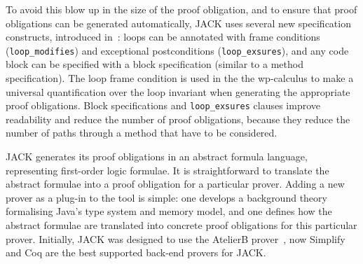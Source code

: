 
To avoid this blow up in the size of the proof obligation, and to
ensure that proof obligations can be generated automatically, JACK
uses several new specification constructs, introduced
in~\cite{BurdyRL03}: loops can be annotated with frame conditions
(\texttt{loop\_modifies}) and exceptional postconditions
(\texttt{loop\_exsures}), and any code block can be specified with a
block specification (similar to a method specification). The loop
frame condition is used in the the wp-calculus to make a universal
quantification over the loop invariant when generating the appropriate
proof obligations. Block specifications and
\texttt{loop\_exsures} clauses improve readability and reduce the
number of proof obligations, because they reduce the number of paths
through a method that have to be considered.


JACK generates its proof obligations in an abstract formula language,
representing first-order logic formulae. It is straightforward to
translate the abstract formulae into a proof obligation for a
particular prover. Adding a new prover as a plug-in to the tool is
simple: one develops a background theory formalising Java's type
system and memory model, and one defines how the abstract formulae are
translated into concrete proof obligations for this particular
prover. Initially, JACK was designed to use the AtelierB
prover~\cite{Abrial96}, now Simplify and Coq are the best
supported back-end provers for JACK.




